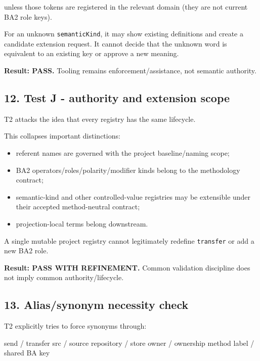 \documentclass[
  10pt,
  a4paper,
]{article}
\newenvironment{Shaded}{}{}
\newcommand{\NormalTok}[1]{#1}
\providecommand{\tightlist}{%
  \setlength{\itemsep}{0pt}\setlength{\parskip}{0pt}}
\begin{document}
unless those tokens are registered in the relevant domain (they are not
current BA2 role keys).

For an unknown \texttt{semanticKind}, it may show existing definitions
and create a candidate extension request. It cannot decide that the
unknown word is equivalent to an existing key or approve a new meaning.

\textbf{Result: PASS.} Tooling remains enforcement/assistance, not
semantic authority.

\subsection{12. Test J - authority and extension
scope}\label{test-j---authority-and-extension-scope}

T2 attacks the idea that every registry has the same lifecycle.

This collapses important distinctions:

\begin{itemize}
\tightlist
\item
  referent names are governed with the project baseline/naming scope;
\item
  BA2 operators/roles/polarity/modifier kinds belong to the methodology
  contract;
\item
  semantic-kind and other controlled-value registries may be extensible
  under their accepted method-neutral contract;
\item
  projection-local terms belong downstream.
\end{itemize}

A single mutable project registry cannot legitimately redefine
\texttt{transfer} or add a new BA2 role.

\textbf{Result: PASS WITH REFINEMENT.} Common validation discipline does
not imply common authority/lifecycle.

\subsection{13. Alias/synonym necessity
check}\label{aliassynonym-necessity-check}

T2 explicitly tries to force synonyms through:

\begin{Shaded}
\begin{Highlighting}[]
\NormalTok{send / transfer}
\NormalTok{src / source}
\NormalTok{repository / store}
\NormalTok{owner / ownership}
\NormalTok{method label / shared BA key}
\end{Highlighting}
\end{Shaded}
\end{document}
